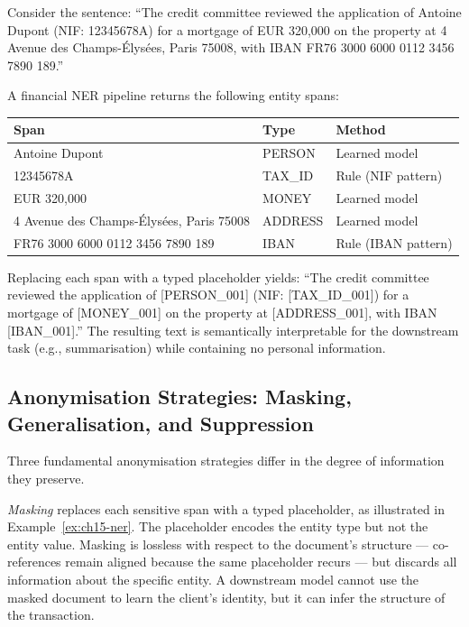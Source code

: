 \begin{example}
\label{ex:ch15-ner}
Consider the sentence: ``The credit committee reviewed the application of Antoine Dupont (NIF: 12345678A) for a mortgage of EUR 320,000 on the property at 4 Avenue des Champs-\'Elys\'ees, Paris 75008, with IBAN FR76 3000 6000 0112 3456 7890 189.''

A financial NER pipeline returns the following entity spans:
\begin{center}
\begin{tabular}{lll}
\toprule
Span & Type & Method \\
\midrule
Antoine Dupont & PERSON & Learned model \\
12345678A & TAX\_ID & Rule (NIF pattern) \\
EUR 320,000 & MONEY & Learned model \\
4 Avenue des Champs-\'Elys\'ees, Paris 75008 & ADDRESS & Learned model \\
FR76 3000 6000 0112 3456 7890 189 & IBAN & Rule (IBAN pattern) \\
\bottomrule
\end{tabular}
\end{center}
Replacing each span with a typed placeholder yields: ``The credit committee reviewed the application of [PERSON\_001] (NIF: [TAX\_ID\_001]) for a mortgage of [MONEY\_001] on the property at [ADDRESS\_001], with IBAN [IBAN\_001].'' The resulting text is semantically interpretable for the downstream task (e.g., summarisation) while containing no personal information.
\end{example}

\subsection{Anonymisation Strategies: Masking, Generalisation, and Suppression}
\label{sec:ch15-strategies}

Three fundamental anonymisation strategies differ in the degree of information they preserve.

\emph{Masking} replaces each sensitive span with a typed placeholder, as illustrated in Example~\ref{ex:ch15-ner}. The placeholder encodes the entity type but not the entity value. Masking is lossless with respect to the document's structure — co-references remain aligned because the same placeholder recurs — but discards all information about the specific entity. A downstream model cannot use the masked document to learn the client's identity, but it can infer the structure of the transaction.


